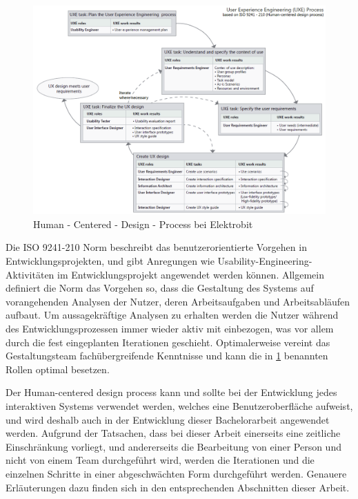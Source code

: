 \begin{figure}[H]
\begin{center}
  \includegraphics[width=\textwidth]{figures/HCD.png}
  \caption{Human - Centered - Design - Process bei Elektrobit}
  \label{fig:HCD}
\end{center}
\end{figure}

Die ISO 9241-210 Norm beschreibt das benutzerorientierte Vorgehen in Entwicklungsprojekten, und gibt Anregungen wie Usability-Engineering-Aktivitäten im Entwicklungsprojekt angewendet werden können.
Allgemein definiert die Norm das Vorgehen so, dass die Gestaltung des Systems auf vorangehenden Analysen der Nutzer, deren Arbeitsaufgaben und Arbeitsabläufen aufbaut.
Um aussagekräftige Analysen zu erhalten werden die Nutzer während des Entwicklungsprozessen immer wieder aktiv mit einbezogen, was vor allem durch die fest eingeplanten Iterationen geschieht.
Optimalerweise vereint das Gestaltungsteam fachübergreifende Kenntnisse und kann die in \cref{fig:HCD} benannten Rollen optimal besetzen\cite{.d}.

Der Human-centered design process kann und sollte bei der Entwicklung jedes interaktiven Systems verwendet werden, welches eine Benutzeroberfläche aufweist, und wird deshalb auch in der Entwicklung dieser Bachelorarbeit angewendet werden.
Aufgrund der Tatsachen, dass bei dieser Arbeit einerseits eine zeitliche Einschränkung vorliegt, und andererseits die Bearbeitung von einer Person und nicht von einem Team durchgeführt wird, werden die Iterationen und die einzelnen Schritte in einer abgeschwächten Form durchgeführt werden. Genauere Erläuterungen dazu finden sich in den entsprechenden Abschnitten dieser Arbeit.

